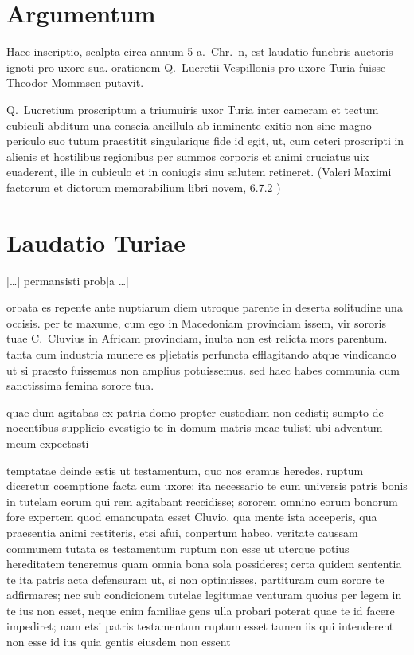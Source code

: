 

\section*{Argumentum}

Haec inscriptio, scalpta circa annum 5 a.~Chr.~n, est laudatio funebris auctoris ignoti pro uxore sua. orationem Q.~Lucretii Vespillonis pro uxore Turia fuisse Theodor Mommsen putavit.

Q.\ Lucretium proscriptum a triumuiris uxor Turia inter cameram et tectum cubiculi abditum una conscia ancillula ab inminente exitio non sine magno periculo suo tutum praestitit singularique fide id egit, ut, cum ceteri proscripti in alienis et hostilibus regionibus per summos corporis et animi cruciatus uix euaderent, ille in cubiculo et in coniugis sinu salutem retineret. (Valeri Maximi factorum et dictorum memorabilium libri novem, 6.7.2 )


\section*{Laudatio Turiae}

[\dots] permansisti prob[a \dots] 

orbata es repente ante nuptiarum diem utroque parente in deserta solitudine una occisis. per te maxume, cum ego in Macedoniam provinciam issem, vir sororis tuae C.~Cluvius in Africam provinciam, inulta non est relicta mors parentum. tanta cum industria munere es p]ietatis perfuncta efflagitando atque vindicando ut si praesto fuissemus non amplius potuissemus. sed haec habes communia cum sanctissima femina sorore tua.

quae dum agitabas ex patria domo propter custodiam non cedisti; sumpto de nocentibus supplicio evestigio te in domum matris meae tulisti ubi adventum meum expectasti 

temptatae deinde estis ut testamentum, quo nos eramus heredes, ruptum diceretur coemptione facta cum uxore; ita necessario te cum universis patris bonis in tutelam eorum qui rem agitabant reccidisse; sororem omnino eorum bonorum fore expertem quod emancupata esset Cluvio. qua mente ista acceperis, qua praesentia animi restiteris, etsi afui, conpertum habeo. veritate caussam communem tutata es testamentum ruptum non esse ut uterque potius hereditatem teneremus quam omnia bona sola possideres; certa quidem sententia te ita patris acta defensuram ut, si non optinuisses, partituram cum sorore te adfirmares; nec sub condicionem tutelae legitumae venturam quoius per legem in te ius non esset, neque enim familiae gens ulla probari poterat quae te id facere impediret; nam etsi patris testamentum ruptum esset tamen iis qui intenderent non esse id ius quia gentis eiusdem non essent 

